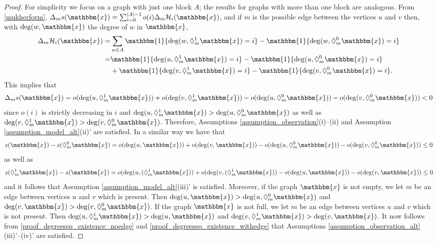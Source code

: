 \documentclass{article}
\begin{document}
\begin{proof}
For simplicity we focus on a graph with just one block $A$; the results for graphs with more than one block are analogous. From \eqref{mukherform}, $\Delta_m s(\mathbbm{x})=
\sum_{i=0}^{\vert A \vert -1} o(i) \Delta_m \mathcal{H}_i(\mathbbm{x})$, and if $m$ is the possible edge between the vertices $u$ and $v$ then, with $\deg (w, \mathbbm{x}) $ the degree of $w$ in $\mathbbm{x}$, 
\begin{align*}
    \Delta_m \mathcal{H}_i(\mathbbm{x})
     =  & \sum_{w \in A}   {\mathbbm{1}}\{ \deg (w, \Diamond_{m}^{1} {\mathbbm{x}})  = i\}
     - {\mathbbm{1}}\{ \deg (w, \Diamond_{m}^{0} {\mathbbm{x}})  = i\}   \\
     = &  {\mathbbm{1}}\{ \deg (u, \Diamond_{m}^{1} {\mathbbm{x}})  = i\}
     - {\mathbbm{1}}\{ \deg (u, \Diamond_{m}^{0} {\mathbbm{x}})  = i\} \\
     & + {\mathbbm{1}}\{ \deg (v, \Diamond_{m}^{1} {\mathbbm{x}})  = i\} - {\mathbbm{1}}\{ \deg (v, \Diamond_{m}^{0} {\mathbbm{x}})  = i\}.
\end{align*}
This implies that
\begin{align*}
    \Delta_m s(\mathbbm{x}) = o( \deg (u, \Diamond_{m}^{1} {\mathbbm{x}}) ) +  o( \deg (v, \Diamond_{m}^{1} {\mathbbm{x}}) ) -  o( \deg (u, \Diamond_{m}^{0} {\mathbbm{x}}) ) -  o( \deg (v, \Diamond_{m}^{0} {\mathbbm{x}}) ) < 0
\end{align*}
since $o(i)$ is strictly decreasing in $i$ and $\deg (u, \Diamond_{m}^{1} {\mathbbm{x}})> \deg (u, \Diamond_{m}^{0} {\mathbbm{x}})$ as well as $\deg (v, \Diamond_{m}^{1} {\mathbbm{x}})> \deg (v, \Diamond_{m}^{0} {\mathbbm{x}})$. Therefore, Assumptions \ref{assumption_observation}(i)--(ii) and Assumption \ref{assumption_model_alt}(ii)' are satisfied. In a similar way we have that
\begin{align} \label{proof_degreeseq_existence_noedge}
    s(\mathbbm{x}) - s( \Diamond_{m}^{0} \mathbbm{x})  = o( \deg (u,  \mathbbm{x}) ) +  o( \deg (v, \mathbbm{x}) ) -  o( \deg (u, \Diamond_{m}^{0} \mathbbm{x}) ) -  o( \deg (v, \Diamond_{m}^{0} {\mathbbm{x}}) ) \leq 0
\end{align}
as well as
\begin{align} \label{proof_degreeseq_existence_withedge}
    s(\Diamond_{m}^{1} \mathbbm{x}) - s( \mathbbm{x})  = o( \deg (u, (\Diamond_{m}^{1} \mathbbm{x}) ) +  o( \deg (v, (\Diamond_{m}^{1} \mathbbm{x}) ) -  o( \deg (u,\mathbbm{x}) ) -  o( \deg (v, \mathbbm{x}) ) \leq 0
\end{align}
and it follows that Assumption \ref{assumption_model_alt}(iii)' is satisfied. Moreover, if the graph $\mathbbm{x}$ is not empty, we let $m$ be an edge between vertices $u$ and $v$ which is present. Then $\deg (u, \mathbbm{x}) > \deg (u, \Diamond_{m}^{0} \mathbbm{x}) $ and $\deg (v,  \mathbbm{x}) > \deg (v, \Diamond_{m}^{0} \mathbbm{x}) $. If the graph $\mathbbm{x}$ is not full, we let $m$ be an edge between vertices $u$ and $v$ which is not present. Then $\deg (u, \Diamond_{m}^{1} \mathbbm{x}) > \deg (u, \mathbbm{x}) $ and $\deg (v, \Diamond_{m}^{1} \mathbbm{x}) > \deg (v, \mathbbm{x}) $. It now follows from \eqref{proof_degreeseq_existence_noedge} and \eqref{proof_degreeseq_existence_withedge} that Assumptions \ref{assumption_observation_alt}(iii)'--(iv)' are satisfied.

\end{proof}
\end{document}
